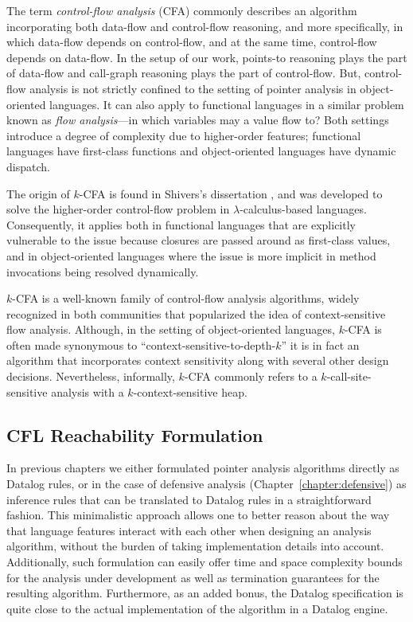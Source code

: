 The term \emph{control-flow analysis} (CFA) commonly describes an algorithm incorporating both data-flow and control-flow reasoning, and more specifically, in which data-flow depends on control-flow, and at the same time, control-flow depends on data-flow. In the setup of our work, points-to reasoning plays the part of data-flow and call-graph reasoning plays the part of control-flow. But, control-flow analysis is not strictly confined to the setting of pointer analysis in object-oriented languages. It can also apply to functional languages in a similar problem known as \emph{flow analysis}---in which variables may a value flow to? Both settings introduce a degree of complexity due to higher-order features; functional languages have first-class functions and object-oriented languages have dynamic dispatch.

The origin of $k$-CFA is found in Shivers's dissertation \cite{thesis:Shivers}, and was developed to solve the higher-order control-flow problem in $\lambda$-calculus-based languages. Consequently, it applies both in functional languages that are explicitly vulnerable to the issue because closures are passed around as first-class values, and in object-oriented languages where the issue is more implicit in method invocations being resolved dynamically.

$k$-CFA is a well-known family of control-flow analysis algorithms, widely recognized in both communities that popularized the idea of context-sensitive flow analysis. Although, in the setting of object-oriented languages, $k$-CFA is often made synonymous to ``context-sensitive-to-depth-$k$'' it is in fact an algorithm that incorporates context sensitivity along with several other design decisions. Nevertheless, informally, $k$-CFA commonly refers to a $k$-call-site-sensitive analysis with a $k$-context-sensitive heap.


\subsection{CFL Reachability Formulation}

In previous chapters we either formulated pointer analysis algorithms directly as Datalog rules, or in the case of defensive analysis (Chapter~\ref{chapter:defensive}) as inference rules that can be translated to Datalog rules in a straightforward fashion. This minimalistic approach allows one to better reason about the way that language features interact with each other when designing an analysis algorithm, without the burden of taking implementation details into account. Additionally, such formulation can easily offer time and space complexity bounds for the analysis under development as well as termination guarantees for the resulting algorithm. Furthermore, as an added bonus, the Datalog specification is quite close to the actual implementation of the algorithm in a Datalog engine.

